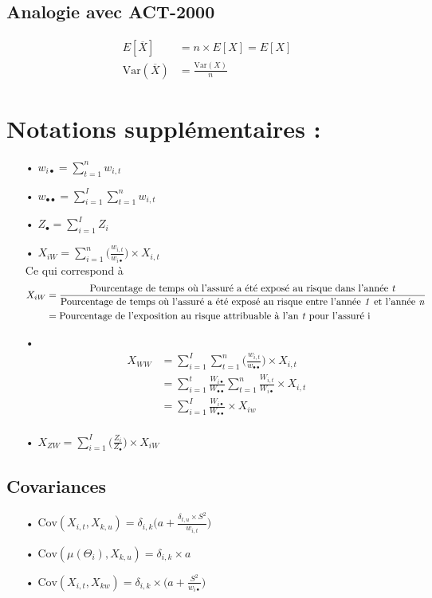 \subsection*{Analogie avec ACT-2000}
\begin{align*}
E[\overline{X}] &= n \times E[X] = E[X] \\
\text{Var}(\overline{X}) &= \frac{\text{Var}(X) }{n}
\end{align*}
\section{Notations supplémentaires :}

\begin{itemize}
\item[•] $w_{i\bullet} = \sum_{t=1}^{n} w_{i,t}$
\item[•] $w_{\bullet \bullet} = \sum_{i=1}^{I} \sum_{t=1}^{n} w_{i,t}$
\item[•] $Z_{\bullet} = \sum_{i=1}^{I} Z_i$
\item[•] $X_{i W} = \sum_{i=1}^{n} \Bigg( \frac{w_{i,t}}{w_{i\bullet}}  \Bigg) \times X_{i,t}$ 
\\
Ce qui correspond à \\
\begin{align*}
X_{i W}&= \frac{\text{Pourcentage de temps où l'assuré a été exposé au risque dans l'année \textit{t}}}{\text{Pourcentage de temps où l'assuré a été exposé au risque entre l'année \textit{1} et l'année \textit{n}}} \\
&= \text{Pourcentage de l'exposition au risque attribuable à l'an \textit{t} pour l'assuré i}
\end{align*}
\item[•] \begin{align*}
X_{W W} &= \sum_{i = 1}^{I} \sum_{t= 1}^{n} \Bigg( \frac{w_{i,t}}{w_{\bullet \bullet}}\Bigg) \times X_{i,t} \\
&= \sum_{i=1}^{t} \frac{W_{i \bullet}}{W_{\bullet \bullet}} \sum_{t=1}^{n} \frac{W_{i, t}}{W_{i \bullet}} \times X_{i,t} \\
&= \sum_{i=1}^{I} \frac{W_{i \bullet}}{W_{\bullet \bullet}} \times X_{i w} \\
\end{align*} 
\item[•] $X_{Z W} = \sum_{i=1}^{I} \Bigg(\frac{Z_i}{Z_{\bullet}}\Bigg) \times X_{i W}$
\end{itemize}

\subsection*{Covariances}
\begin{itemize}
\item[•] $\text{Cov}(X_{i,t}, X_{k, u}) = \delta_{i,k} \Big(  a + \frac{\delta_{t,u} \times S^2}{w_{i,t}}\Big)$
\item[•] $\text{Cov}(\mu(\Theta_i), X_{k, u}) = \delta_{i,k} \times a $
\item[•] $\text{Cov}(X_{i,t}, X_{k w}) = \delta_{i,k} \times \Big(a + \frac{S^2}{w_{i \bullet}} \Big) $
\end{itemize}


